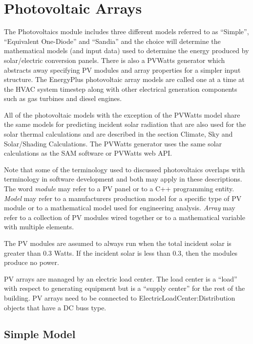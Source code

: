 \section{Photovoltaic Arrays}\label{photovoltaic-arrays}

The Photovoltaics module includes three different models referred to as ``Simple'', ``Equivalent One-Diode'' and ``Sandia'' and the choice will determine the mathematical models (and input data) used to determine the energy produced by solar/electric conversion panels. There is also a PVWatts generator which abstracts away specifying PV modules and array properties for a simpler input structure. The EnergyPlus photovoltaic array models are called one at a time at the HVAC system timestep along with other electrical generation components such as gas turbines and diesel engines.

All of the photovoltaic models with the exception of the PVWatts model share the same models for predicting incident solar radiation that are also used for the solar thermal calculations and are described in the section Climate, Sky and Solar/Shading Calculations. The PVWatts generator uses the same solar calculations as the SAM software or PVWatts web API.

Note that some of the terminology used to discussed photovoltaics overlaps with terminology in software development and both may apply in these descriptions. The word \emph{module} may refer to a PV panel or to a C++ programming entity. \emph{Model} may refer to a manufacturers production model for a specific type of PV module or to a mathematical model used for engineering analysis. \emph{Array} may refer to a collection of PV modules wired together or to a mathematical variable with multiple elements.

The PV modules are assumed to always run when the total incident solar is greater than 0.3 Watts. If the incident solar is less than 0.3, then the modules produce no power.

PV arrays are managed by an electric load center. The load center is a ``load'' with respect to generating equipment but is a ``supply center'' for the rest of the building. PV arrays need to be connected to ElectricLoadCenter:Distribution objects that have a DC buss type.

\subsection{Simple Model}\label{simple-model}

